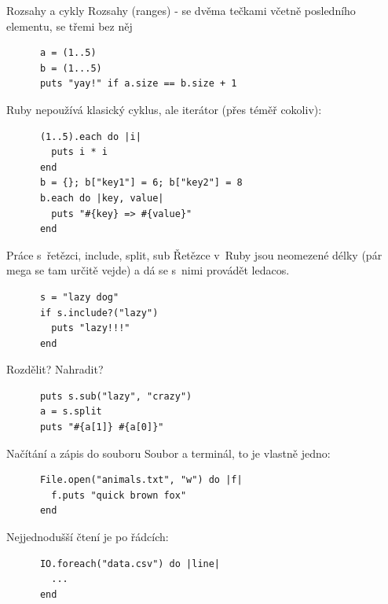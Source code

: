 \documentclass{beamer}
\begin{document}
\begin{frame}[fragile]{Rozsahy a cykly}
  Rozsahy (ranges) - se dvěma tečkami včetně posledního elementu, se třemi bez něj
  \begin{block}{}
    {\scriptsize \begin{verbatim}
      a = (1..5)
      b = (1...5)
      puts "yay!" if a.size == b.size + 1
    \end{verbatim}}
  \end{block}
  \pause
  Ruby nepoužívá klasický cyklus, ale iterátor (přes téměř cokoliv):
  \begin{block}{}
    {\scriptsize \begin{verbatim}
      (1..5).each do |i|
        puts i * i
      end
      b = {}; b["key1"] = 6; b["key2"] = 8
      b.each do |key, value|
        puts "#{key} => #{value}"
      end
    \end{verbatim}}
  \end{block}
\end{frame}

\begin{frame}[fragile]{Práce s~řetězci, include, split, sub}
  Řetězce v~Ruby jsou neomezené délky (pár mega se tam určitě vejde) a dá se s~nimi provádět ledacos.
  \begin{block}{}
    {\scriptsize \begin{verbatim}
      s = "lazy dog"
      if s.include?("lazy")
        puts "lazy!!!"
      end
    \end{verbatim}}
  \end{block}
  \pause
  Rozdělit? Nahradit?
  \begin{block}{}
    {\scriptsize \begin{verbatim}
      puts s.sub("lazy", "crazy")
      a = s.split
      puts "#{a[1]} #{a[0]}"
    \end{verbatim}}
  \end{block}
\end{frame}

\begin{frame}[fragile]{Načítání a zápis do souboru}
  Soubor a terminál, to je vlastně jedno:
  \begin{block}{}
    {\scriptsize \begin{verbatim}
      File.open("animals.txt", "w") do |f|
        f.puts "quick brown fox"
      end
    \end{verbatim}}
  \end{block}
  \pause
  Nejjednodušší čtení je po řádcích:
  \begin{block}{}
    {\scriptsize \begin{verbatim}
      IO.foreach("data.csv") do |line|
        ...
      end
    \end{verbatim}}
  \end{block}
\end{frame}
\end{document}
